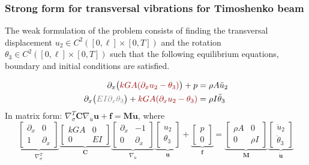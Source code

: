 \documentclass[aspectratio=169]{beamer}
\begin{document}
\begin{frame}
  \frametitle{Strong form for transversal vibrations for Timoshenko beam}
  \vspace{-0.5cm}
  The weak formulation of the problem consists of finding the transversal displacement $u_{2}\in C^2([0,\ell]\times[0,T])$ and the rotation $\theta_{3}\in C^2([0,\ell]\times[0,T])$ such that the following equilibrium equations, boundary and initial conditions are satisfied.
  \begin{block}{}
    \vspace{-.5cm}
    \begin{align*}
      \partial_{x}\big({\color{darkred}kGA(\partial_{x}u_{2}-\theta_{3})}\big)+p                                      & =\rho A\ddot u_{2}      \\
      \partial_{x}\big({\color{gray}EI\partial_{x}\theta_{3}}\big)+{\color{darkred}kGA(\partial_{x}u_{2}-\theta_{3})} & =\rho I\ddot \theta_{3} \\
    \end{align*}
    \vspace{-1cm}\newline\small In matrix form: $\nabla_{\sigma}^{T}\mathbf C\nabla_{u}\mathbf u+\mathbf f=\mathbf {M \ddot u}$, where
    $$\underbrace{\begin{bmatrix}
          \partial_{x} & 0            \\
          1            & \partial_{x}
        \end{bmatrix}}_\text{$\nabla_{\sigma}^{T}$}
      \underbrace{\begin{bmatrix}
          kGA & 0  \\
          0   & EI
        \end{bmatrix}}_\text{$\mathbf C$}
      \underbrace{\begin{bmatrix}
          \partial_{x} & -1           \\
          0            & \partial_{x}
        \end{bmatrix}}_\text{$\nabla_{u}$}
      \underbrace{\begin{bmatrix}
          u_{2} \\
          \theta_{3}
        \end{bmatrix}}_\text{$\mathbf u$}
      +
      \underbrace{\begin{bmatrix}
          p \\
          0
        \end{bmatrix}}_\text{$\mathbf f$}
      =
      \underbrace{\begin{bmatrix}
          \rho A & 0      \\
          0      & \rho I
        \end{bmatrix}}_\text{$\mathbf M$}
      \underbrace{\begin{bmatrix}
          \ddot u_{2} \\
          \ddot \theta_{3}
        \end{bmatrix}}_\text{$\mathbf{\ddot u}$}
    $$
  \end{block}
\end{frame}
\end{document}
